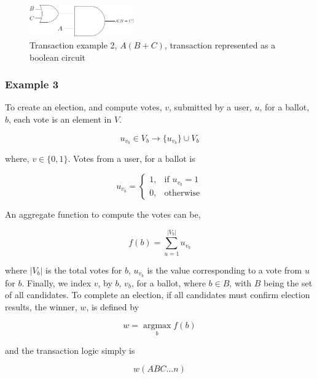 \documentclass[10pt, titlepage, twocolumn]{report}
\begin{document}
\begin{figure}[ht]
\centering
	\includegraphics[width=0.4\textwidth]{txexample2}
	\caption{Transaction example 2, \(A(B+C)\), transaction represented as a boolean circuit}
	\label{txexample2}
\end{figure}




\subsubsection{Example 3}
To create an election, and compute votes, \(v\), submitted by a user, \(u\), for a ballot, \(b\), each vote is an element in \(V\).


\begin{equation}
u_{v_{b}} \in V_b \rightarrow \{u_{v_{b}}\} \cup V_b
\end{equation}

where, \(v \in \{0,1\} \). Votes from a user, for a ballot is


\[
    u_{v_{b}} = 
\begin{cases}
    1,		   & \text{if } u_{v_{b}} = 1\\
    0,              & \text{otherwise}
\end{cases}
\]


 An aggregate function to compute the votes can be,

\begin{equation}
f(b) = \sum_{u=1}^{\vert V_b \vert} u_{v_{b}}
\end{equation}

where \(\vert V_b \vert \) is the total votes for \(b\), \(u_{v_{b}}\) is the value corresponding to a vote from \(u\) for \(b\). Finally, we index \(v\), by \(b\), \(v_b\),  for a ballot, where \(b \in B\), with \(B\) being the set of all candidates. To complete an election, if all candidates must confirm election results, the winner, \(w\), is defined by


\begin{equation}
w = \operatorname*{argmax}_{b} f(b)
\end{equation}


and the transaction logic simply is

\begin{equation}
w(ABC ... n)
\end{equation}
\end{document}

